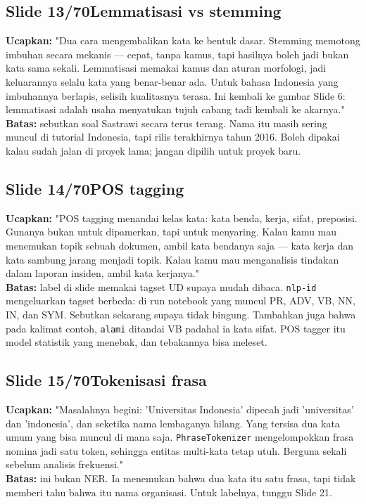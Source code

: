 \documentclass[11pt]{article}
\renewcommand{\framebox}[1]{\colorbox{acc!15}{\textcolor{acc}{\textbf{#1}}}}
\begin{document}
\subsection*{\framebox{Slide 13/70}\quad Lemmatisasi vs stemming}
\textbf{Ucapkan:} "Dua cara mengembalikan kata ke bentuk dasar. Stemming memotong imbuhan secara mekanis — cepat, tanpa kamus, tapi hasilnya boleh jadi bukan kata sama sekali. Lemmatisasi memakai kamus dan aturan morfologi, jadi keluarannya selalu kata yang benar-benar ada. Untuk bahasa Indonesia yang imbuhannya berlapis, selisih kualitasnya terasa. Ini kembali ke gambar Slide 6: lemmatisasi adalah usaha menyatukan tujuh cabang tadi kembali ke akarnya."\\[2pt]
\textbf{Batas:} sebutkan soal Sastrawi secara terus terang. Nama itu masih sering muncul di tutorial Indonesia, tapi rilis terakhirnya tahun 2016. Boleh dipakai kalau sudah jalan di proyek lama; jangan dipilih untuk proyek baru.\\[2pt]

\subsection*{\framebox{Slide 14/70}\quad POS tagging}
\textbf{Ucapkan:} "POS tagging menandai kelas kata: kata benda, kerja, sifat, preposisi. Gunanya bukan untuk dipamerkan, tapi untuk menyaring. Kalau kamu mau menemukan topik sebuah dokumen, ambil kata bendanya saja — kata kerja dan kata sambung jarang menjadi topik. Kalau kamu mau menganalisis tindakan dalam laporan insiden, ambil kata kerjanya."\\[2pt]
\textbf{Batas:} label di slide memakai tagset UD supaya mudah dibaca. \texttt{nlp-id} mengeluarkan tagset berbeda: di run notebook yang muncul PR, ADV, VB, NN, IN, dan SYM. Sebutkan sekarang supaya tidak bingung. Tambahkan juga bahwa pada kalimat contoh, \texttt{alami} ditandai VB padahal ia kata sifat. POS tagger itu model statistik yang menebak, dan tebakannya bisa meleset.\\[2pt]

\subsection*{\framebox{Slide 15/70}\quad Tokenisasi frasa}
\textbf{Ucapkan:} "Masalahnya begini: 'Universitas Indonesia' dipecah jadi 'universitas' dan 'indonesia', dan seketika nama lembaganya hilang. Yang tersisa dua kata umum yang bisa muncul di mana saja. \texttt{PhraseTokenizer} mengelompokkan frasa nomina jadi satu token, sehingga entitas multi-kata tetap utuh. Berguna sekali sebelum analisis frekuensi."\\[2pt]
\textbf{Batas:} ini bukan NER. Ia menemukan bahwa dua kata itu satu frasa, tapi tidak memberi tahu bahwa itu nama organisasi. Untuk labelnya, tunggu Slide 21.\\[2pt]
\end{document}
